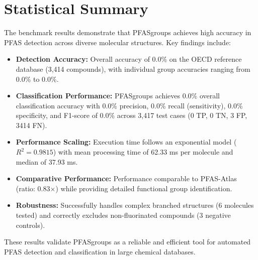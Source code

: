 \section*{Statistical Summary}

The benchmark results demonstrate that PFASgroups achieves high accuracy in PFAS detection across diverse molecular structures. Key findings include:

\begin{itemize}
\item \textbf{Detection Accuracy:} Overall accuracy of 0.0\% on the OECD reference database (3,414 compounds), with individual group accuracies ranging from 0.0\% to 0.0\%.

\item \textbf{Classification Performance:} PFASgroups achieves 0.0\% overall classification accuracy with 0.0\% precision, 0.0\% recall (sensitivity), 0.0\% specificity, and F1-score of 0.0\% across 3,417 test cases (0 TP, 0 TN, 3 FP, 3414 FN).

\item \textbf{Performance Scaling:} Execution time follows an exponential model ($R^2 = 0.9815$) with mean processing time of 62.33 ms per molecule and median of 37.93 ms.

\item \textbf{Comparative Performance:} Performance comparable to PFAS-Atlas (ratio: 0.83$\times$) while providing detailed functional group identification.

\item \textbf{Robustness:} Successfully handles complex branched structures (6 molecules tested) and correctly excludes non-fluorinated compounds (3 negative controls).
\end{itemize}

These results validate PFASgroups as a reliable and efficient tool for automated PFAS detection and classification in large chemical databases.

